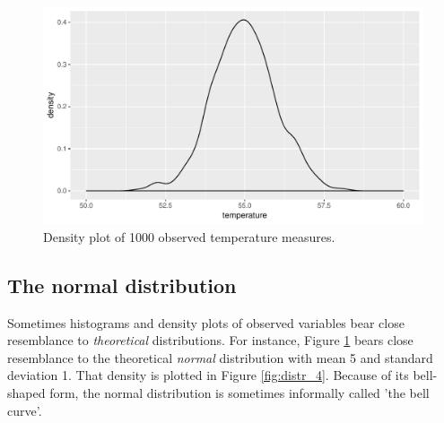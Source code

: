 \documentclass[]{report}\usepackage[]{graphicx}\usepackage[]{color}
\makeatletter
\def\maxwidth{ %
  \ifdim\Gin@nat@width>\linewidth
    \linewidth
  \else
    \Gin@nat@width
  \fi
}
\newenvironment{knitrout}{}{} %
\makeatother
\begin{document}
\begin{knitrout}
\color{fgcolor}\begin{figure}

{\centering \includegraphics[width=\maxwidth]{figure/distr_3-1} 

}

\caption[Density plot of 1000 observed temperature measures]{Density plot of 1000 observed temperature measures.}\label{fig:distr_3}
\end{figure}


\end{knitrout}




\subsection{The normal distribution}

Sometimes histograms and density plots of observed variables bear close resemblance to \textit{theoretical} distributions. For instance, Figure \ref{fig:distr_3} bears close resemblance to the theoretical \textit{normal} distribution with mean 5 and standard deviation 1. That density is plotted in Figure \ref{fig:distr_4}. Because of its bell-shaped form, the normal distribution is sometimes informally called 'the bell curve'. 
\end{document}
